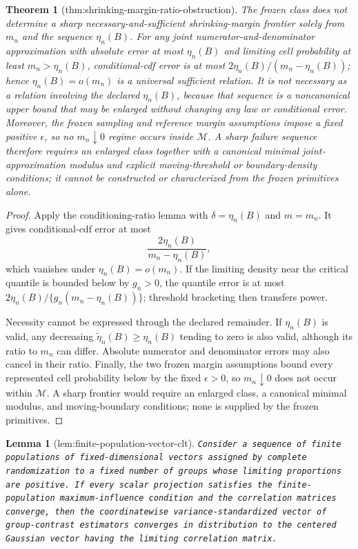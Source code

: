 \documentclass{article}
\newtheorem{theorem}{Theorem}
\newtheorem{lemma}{Lemma}
\begin{document}
\begin{theorem}[thm:shrinking-margin-ratio-obstruction]\label{thm:shrinking-margin-ratio-obstruction}
The frozen class does not determine a sharp necessary-and-sufficient shrinking-margin frontier solely from \(m_n\) and the sequence \(\eta_n(B)\). For any joint numerator-and-denominator approximation with absolute error at most \(\eta_n(B)\) and limiting cell probability at least \(m_n>\eta_n(B)\), conditional-cdf error is at most \(2\eta_n(B)/(m_n-\eta_n(B))\); hence \(\eta_n(B)=o(m_n)\) is a universal sufficient relation. It is not necessary as a relation involving the declared \(\eta_n(B)\), because that sequence is a noncanonical upper bound that may be enlarged without changing any law or conditional error. Moreover, the frozen sampling and reference margin assumptions impose a fixed positive \(\epsilon\), so no \(m_n\downarrow0\) regime occurs inside \(\mathcal M\). A sharp failure sequence therefore requires an enlarged class together with a canonical minimal joint-approximation modulus and explicit moving-threshold or boundary-density conditions; it cannot be constructed or characterized from the frozen primitives alone.
\end{theorem}
\begin{proof}
Apply the conditioning-ratio lemma with \(\delta=\eta_n(B)\) and \(m=m_n\).  It gives conditional-cdf error at most
\[
\frac{2\eta_n(B)}{m_n-\eta_n(B)},
\]
which vanishes under \(\eta_n(B)=o(m_n)\).  If the limiting density near the critical quantile is bounded below by \(g_n>0\), the quantile error is at most \(2\eta_n(B)/\{g_n(m_n-\eta_n(B))\}\); threshold bracketing then transfers power.

Necessity cannot be expressed through the declared remainder.  If \(\eta_n(B)\) is valid, any decreasing \(\widetilde\eta_n(B)\ge\eta_n(B)\) tending to zero is also valid, although its ratio to \(m_n\) can differ.  Absolute numerator and denominator errors may also cancel in their ratio.  Finally, the two frozen margin assumptions bound every represented cell probability below by the fixed \(\epsilon>0\), so \(m_n\downarrow0\) does not occur within \(\mathcal M\).  A sharp frontier would require an enlarged class, a canonical minimal modulus, and moving-boundary conditions; none is supplied by the frozen primitives.
\end{proof}

\begin{lemma}[lem:finite-population-vector-clt]\label{lem:finite-population-vector-clt}
\texttt{Consider a sequence of finite populations of fixed-\allowbreak{}dimensional vectors assigned by complete randomization to a fixed number of groups whose limiting proportions are positive. If every scalar projection satisfies the finite-\allowbreak{}population maximum-\allowbreak{}influence condition and the correlation matrices converge,\allowbreak{} then the coordinatewise variance-\allowbreak{}standardized vector of group-\allowbreak{}contrast estimators converges in distribution to the centered Gaussian vector having the limiting correlation matrix.}
\end{lemma}
\end{document}
